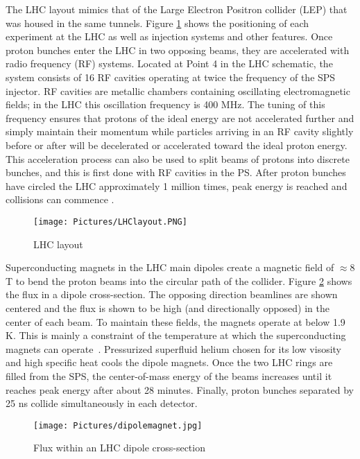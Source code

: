 The LHC layout mimics that of the Large Electron Positron collider (LEP) that was housed in the same tunnels. Figure \ref{fig:LHClayout} shows the positioning of each experiment at the LHC as well as injection systems and other features. Once proton bunches enter the LHC in two opposing beams, they are accelerated with radio frequency (RF) systems. Located at Point 4 in the LHC schematic, the system consists of 16 RF cavities operating at twice the frequency of the SPS injector. RF cavities are metallic chambers containing oscillating electromagnetic fields; in the LHC this oscillation frequency is 400 MHz. The tuning of this frequency ensures that protons of the ideal energy are not accelerated further and simply maintain their momentum while particles arriving in an RF cavity slightly before or after will be decelerated or accelerated toward the ideal proton energy. This acceleration process can also be used to split beams of protons into discrete bunches, and this is first done with RF cavities in the PS. After proton bunches have circled the LHC approximately 1 million times, peak energy is reached and collisions can commence \cite{radiofrequency}.

\begin{figure}[!h]
        \centering
    \texttt{[image: Pictures/LHClayout.PNG]}
    \caption{LHC layout \cite{LHCref}}
    \label{fig:LHClayout}
\end{figure}

Superconducting magnets in the LHC main dipoles create a magnetic field of $\approx 8$ T to bend the proton beams into the circular path of the collider. Figure \ref{fig:dipolemagnet} shows the flux in a dipole cross-section. The opposing direction beamlines are shown centered and the flux is shown to be high (and directionally opposed) in the center of each beam. To maintain these fields, the magnets operate at below 1.9 K. This is mainly a constraint of the temperature at which the superconducting magnets can operate~\cite{magnets}. Pressurized superfluid helium chosen for its low visosity and high specific heat cools the dipole magnets. Once the two LHC rings are filled from the SPS, the center-of-mass energy of the beams increases until it reaches peak energy after about 28 minutes. Finally, proton bunches separated by 25 ns collide simultaneously in each detector.  

\begin{figure}[!h]
        \centering
    \texttt{[image: Pictures/dipolemagnet.jpg]}
    \caption{ Flux within an LHC dipole cross-section \cite{LHCref}}
    \label{fig:dipolemagnet}
\end{figure}

